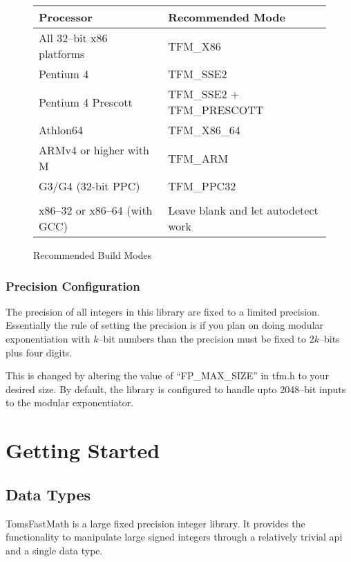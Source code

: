 \documentclass[b5paper]{book}
\begin{document}
\begin{figure}[here]
\begin{small}
\begin{center}
\begin{tabular}{|l|l|}
\hline \textbf{Processor} & \textbf{Recommended Mode} \\
\hline All 32--bit x86 platforms  & TFM\_X86 \\
\hline Pentium 4                  & TFM\_SSE2 \\
\hline Pentium 4 Prescott         & TFM\_SSE2 + TFM\_PRESCOTT \\
\hline Athlon64                   & TFM\_X86\_64 \\
\hline ARMv4 or higher with M     & TFM\_ARM \\
\hline G3/G4 (32-bit PPC)         & TFM\_PPC32 \\
\hline &\\
\hline x86--32 or x86--64 (with GCC) & Leave blank and let autodetect work \\
\hline
\end{tabular}
\caption{Recommended Build Modes}
\end{center}
\end{small}
\end{figure}

\subsection{Precision Configuration}
The precision of all integers in this library are fixed to a limited precision.  Essentially
the rule of setting the precision is if you plan on doing modular exponentiation with $k$--bit
numbers than the precision must be fixed to $2k$--bits plus four digits.  

This is changed by altering the value of ``FP\_MAX\_SIZE'' in tfm.h to your desired size.  By default, 
the library is configured to handle upto 2048--bit inputs to the modular exponentiator.  

\chapter{Getting Started}
\section{Data Types}
TomsFastMath is a large fixed precision integer library.  It provides the functionality to 
manipulate large signed integers through a relatively trivial api and a single data type.
\end{document}
